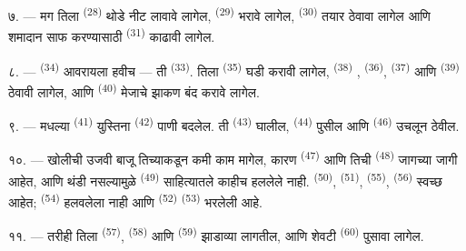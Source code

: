 ७. --- मग तिला  \textsuperscript{(28)} थोडे नीट लावावे लागेल,
 \textsuperscript{(29)} भरावे लागेल, 
\textsuperscript{(30)} तयार ठेवावा लागेल आणि शमादान साफ करण्यासाठी 
\textsuperscript{(31)} काढावी लागेल.

\VUsaut{5.0mm}
\VUsaut{3.0mm}

८. ---  \textsuperscript{(34)} आवरायला हवीच — ती 
\textsuperscript{(33)}. तिला  \textsuperscript{(35)} घडी करावी लागेल,
 \textsuperscript{(38)} , 
\textsuperscript{(36)},  \textsuperscript{(37)} आणि 
\textsuperscript{(39)} ठेवावी लागेल, आणि  \textsuperscript{(40)} मेजाचे झाकण
बंद करावे लागेल.

९. --- मधल्या  \textsuperscript{(41)} युस्तिना 
\textsuperscript{(42)} पाणी बदलेल. ती  \textsuperscript{(43)} 
घालील,  \textsuperscript{(44)} पुसील आणि 
\textsuperscript{(46)} उचलून ठेवील.

१०. --- खोलीची उजवी बाजू तिच्याकडून कमी काम मागेल, कारण 
\textsuperscript{(47)} आणि तिची  \textsuperscript{(48)} जागच्या जागी आहेत, आणि
थंडी नसल्यामुळे  \textsuperscript{(49)} साहित्यातले काहीच हललेले नाही.
 \textsuperscript{(50)},  \textsuperscript{(51)},
 \textsuperscript{(55)},  \textsuperscript{(56)} स्वच्छ
आहेत;  \textsuperscript{(54)} हलवलेला नाही आणि 
\textsuperscript{(52)}  \textsuperscript{(53)} भरलेली आहे.



११. --- तरीही तिला  \textsuperscript{(57)}, 
\textsuperscript{(58)} आणि  \textsuperscript{(59)}
झाडाव्या लागतील, आणि शेवटी  \textsuperscript{(60)} पुसावा लागेल.

